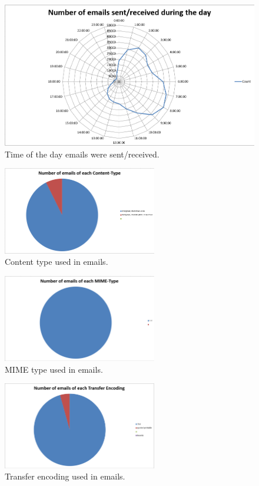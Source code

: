 \documentclass[hidelinks,english]{article}
\begin{document}
		\begin{figure}[h]
			\centering
			\includegraphics[width=\textwidth]{time_sent.png}
			\caption{Time of the day emails were sent/received.}
			\label{fig:time_sent}
		\end{figure}
		
		\begin{figure}[h]
			\centering
			\includegraphics[width=0.6\textwidth]{content_type.png}
			\caption{Content type used in emails.}
			\label{fig:content_type}
		\end{figure}
		
		\begin{figure}[h]
			\centering
			\includegraphics[width=0.6\textwidth]{mime_type.png}
			\caption{MIME type used in emails.}
			\label{fig:mime_type}
		\end{figure}
		
		\begin{figure}[h]
			\centering
			\includegraphics[width=0.6\textwidth]{transfer_encoding.png}
			\caption{Transfer encoding used in emails.}
			\label{fig:transfer_encoding}
		\end{figure}
		
\end{document}
